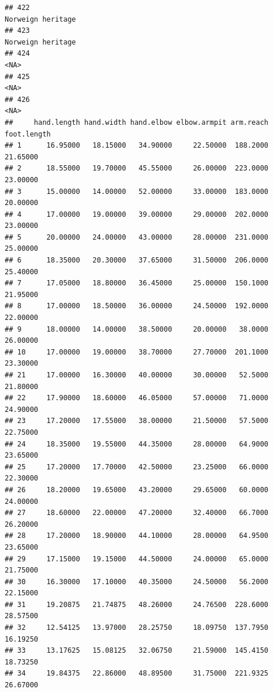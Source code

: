 \documentclass[]{article}
\begin{document}
\begin{verbatim}
## 422                                                                                                                                   Norweign heritage
## 423                                                                                                                                   Norweign heritage
## 424                                                                                                                                                <NA>
## 425                                                                                                                                                <NA>
## 426                                                                                                                                                <NA>
##     hand.length hand.width hand.elbow elbow.armpit arm.reach foot.length
## 1      16.95000   18.15000   34.90000     22.50000  188.2000    21.65000
## 2      18.55000   19.70000   45.55000     26.00000  223.0000    23.00000
## 3      15.00000   14.00000   52.00000     33.00000  183.0000    20.00000
## 4      17.00000   19.00000   39.00000     29.00000  202.0000    23.00000
## 5      20.00000   24.00000   43.00000     28.00000  231.0000    25.00000
## 6      18.35000   20.30000   37.65000     31.50000  206.0000    25.40000
## 7      17.05000   18.80000   36.45000     25.00000  150.1000    21.95000
## 8      17.00000   18.50000   36.00000     24.50000  192.0000    22.00000
## 9      18.00000   14.00000   38.50000     20.00000   38.0000    26.00000
## 10     17.00000   19.00000   38.70000     27.70000  201.1000    23.30000
## 21     17.00000   16.30000   40.00000     30.00000   52.5000    21.80000
## 22     17.90000   18.60000   46.05000     57.00000   71.0000    24.90000
## 23     17.20000   17.55000   38.00000     21.50000   57.5000    22.75000
## 24     18.35000   19.55000   44.35000     28.00000   64.9000    23.65000
## 25     17.20000   17.70000   42.50000     23.25000   66.0000    22.30000
## 26     18.20000   19.65000   43.20000     29.65000   60.0000    24.00000
## 27     18.60000   22.00000   47.20000     32.40000   66.7000    26.20000
## 28     17.20000   18.90000   44.10000     28.00000   64.9500    23.65000
## 29     17.15000   19.15000   44.50000     24.00000   65.0000    21.75000
## 30     16.30000   17.10000   40.35000     24.50000   56.2000    22.15000
## 31     19.20875   21.74875   48.26000     24.76500  228.6000    28.57500
## 32     12.54125   13.97000   28.25750     18.09750  137.7950    16.19250
## 33     13.17625   15.08125   32.06750     21.59000  145.4150    18.73250
## 34     19.84375   22.86000   48.89500     31.75000  221.9325    26.67000

\end{verbatim}
\end{document}
